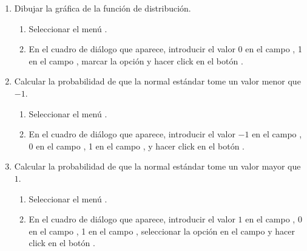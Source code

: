 \begin{enumerate}[leftmargin=*]
\begin{enumerate}
\item Dibujar la gráfica de la función de distribución. 
\begin{indicacion}
\begin{enumerate}
\item Seleccionar el menú .
\item En el cuadro de diálogo que aparece, introducir el valor 0 en el campo , 1 en el campo
, marcar la opción  y hacer click en el botón .
\end{enumerate}
\end{indicacion}

\item Calcular la probabilidad de que la normal estándar tome un valor menor que $-1$. 
\begin{indicacion}
\begin{enumerate}
\item Seleccionar el menú .
\item En el cuadro de diálogo que aparece, introducir el valor $-1$ en el campo , 0 en el campo  
, 1 en el campo , y hacer click en el botón .
\end{enumerate}
\end{indicacion}

\item Calcular la probabilidad de que la normal estándar tome un valor mayor que $1$. 
\begin{indicacion}
\begin{enumerate}
\item Seleccionar el menú .
\item En el cuadro de diálogo que aparece, introducir el valor $1$ en el campo , 0 en el campo  
, 1 en el campo , seleccionar la opción  en el campo
 y hacer click en el botón .
\end{enumerate}
\end{indicacion}


\end{enumerate}
\end{enumerate}
